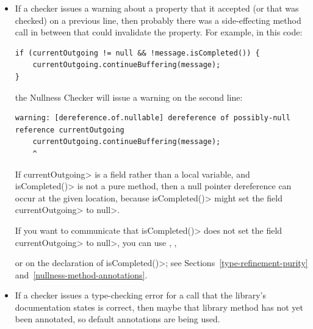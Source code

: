 \begin{itemize}
If the annotations do not appear in the  file, here are two
ways to solve the problem:
\begin{itemize}
\item
  Re-compile the method's class with the Checker Framework compiler.  This will
  ensure that the type annotations are written to the class file, even if
  no type-checking happens during that execution.
\item
  Pass the method's file explicitly on the command line when type-checking,
  so that the compiler reads its source code instead of its 
  file.
\end{itemize}

\item
If a checker issues a warning about a property that it accepted (or that
was checked) on a previous line, then probably there was a side-effecting
method call in between that could invalidate the property.  For example, in
this code:

\begin{Verbatim}
if (currentOutgoing != null && !message.isCompleted()) {
    currentOutgoing.continueBuffering(message);
}
\end{Verbatim}

\noindent
the Nullness Checker will issue a warning on the second line:
\begin{Verbatim}
warning: [dereference.of.nullable] dereference of possibly-null reference currentOutgoing
    currentOutgoing.continueBuffering(message);
    ^
\end{Verbatim}

If \<currentOutgoing> is a field rather than a local variable, and
\<isCompleted()> is not a pure method, then a null pointer
dereference can occur at the given location, because \<isCompleted()> might set
the field \<currentOutgoing> to \<null>.

If you want to communicate that
\<isCompleted()> does not set the field \<currentOutgoing> to \<null>, you can use
,
,

or  on the
declaration of \<isCompleted()>; see Sections~\ref{type-refinement-purity}
and~\ref{nullness-method-annotations}.


\item
If a checker issues a type-checking error for a call that the library's
documentation states is correct, then maybe that library method has not yet
been annotated, so default annotations are being used.


\end{itemize}
